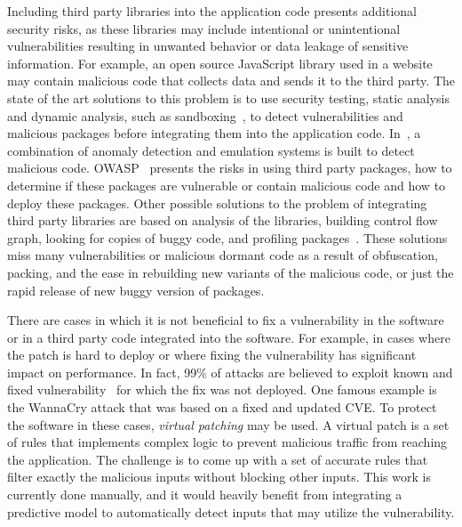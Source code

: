 \documentclass[a4paper,11pt]{article}
\begin{document}
Including third party libraries into the application code presents additional
security risks, as these libraries may include intentional or unintentional
vulnerabilities resulting in unwanted behavior or data leakage of sensitive 
information. For example, an open source JavaScript library used in a website 
may contain malicious code that collects data and sends it to the third party. 
The state of the art solutions to this problem is to use security testing, static 
analysis and dynamic analysis, such as sandboxing~\cite{jsand}, to detect 
vulnerabilities and malicious packages before integrating them into 
the application code. %
In~\cite{Cova}, a combination of anomaly detection and emulation systems is built to detect malicious code. OWASP~\cite{OWASP} presents the risks in using third party 
packages, how to determine if these packages are vulnerable or contain malicious code 
and how to deploy these packages. %
Other possible solutions to the problem of integrating third party libraries are
based on analysis of the libraries, building control flow graph, looking for 
copies of buggy code, and profiling packages~\cite{Hanna, XinSun}.%
These solutions miss many vulnerabilities or malicious dormant code as a result of 
obfuscation, packing, and the ease in rebuilding new variants of the malicious code, 
or just the rapid release of new buggy version of packages.

There are cases in which it is not beneficial to fix a vulnerability in the 
software or in a third party code integrated into the software. For example, 
in cases where the patch is hard to deploy or where fixing the vulnerability 
has significant impact on performance. In fact, 99\% of attacks are believed to exploit known and fixed vulnerability~\cite{GartnerVulnerability} for which the fix was not deployed. One famous example is the WannaCry attack that was based on a fixed and updated CVE.
To protect the software in these cases,
\emph{virtual patching} may be used. %
A virtual patch is a set of rules that implements complex logic to prevent 
malicious traffic from reaching the application. 
The challenge is to come up with a set of accurate rules that filter 
exactly the malicious inputs without blocking other inputs. This work is 
currently done manually, and it would heavily benefit from integrating a 
predictive model to automatically detect inputs that may utilize the 
vulnerability.
\end{document}
